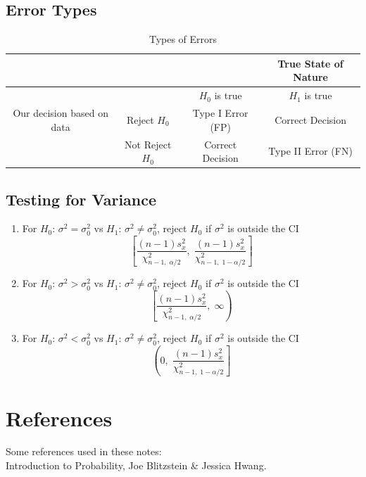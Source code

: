 \documentclass{article}
\begin{document}
\subsection{Error Types}

\begin{table}[H]
    \centering
    \begin{tabular}{| c | c | c | c |}
        \hline & & & True State of Nature \\ \hline
        & & $H_{0}$ is true & $H_{1}$ is true \\ \hline  
        Our decision based on data & Reject $H_{0}$ & Type I Error (FP) & Correct Decision \\ \hline 
        & Not Reject $H_{0}$ & Correct Decision & Type II Error (FN) \\ \hline 
    \end{tabular}
    \caption{Types of Errors}
    \label{16-typeoferror}
\end{table}

\subsection{Testing for Variance}
\begin{enumerate}
    \item For $H_{0}$: $\sigma^{2} = \sigma^{2}_0$ vs $H_{1}$: $\sigma^{2} \neq \sigma^{2}_0$, reject $H_{0}$ if $\sigma^{2}$ is outside the CI \begin{equation*}
        \left[ \frac{(n-1)s^{2}_x}{\chi^{2}_{n-1, \; \alpha / 2}}, \;  \frac{(n-1)s^{2}_x}{\chi^{2}_{n-1, \; 1-\alpha / 2}}\right]
    \end{equation*}
    \item For $H_{0}$: $\sigma^{2} > \sigma^{2}_0$ vs $H_{1}$: $\sigma^{2} \neq \sigma^{2}_0$, reject $H_{0}$ if $\sigma^{2}$ is outside the CI \begin{equation*}
        \left[ \frac{(n-1)s^{2}_x}{\chi^{2}_{n-1, \; \alpha / 2}}, \;  \infty\right)
    \end{equation*}
    \item For $H_{0}$: $\sigma^{2} < \sigma^{2}_0$ vs $H_{1}$: $\sigma^{2} \neq \sigma^{2}_0$, reject $H_{0}$ if $\sigma^{2}$ is outside the CI \begin{equation*}
        \left( 0, \;  \frac{(n-1)s^{2}_x}{\chi^{2}_{n-1, \; 1-\alpha / 2}}\right]
    \end{equation*}
\end{enumerate}



\newpage 

\section*{References}

Some references used in these notes: \\ 

Introduction to Probability, Joe Blitzstein \& Jessica Hwang. 
\end{document}
